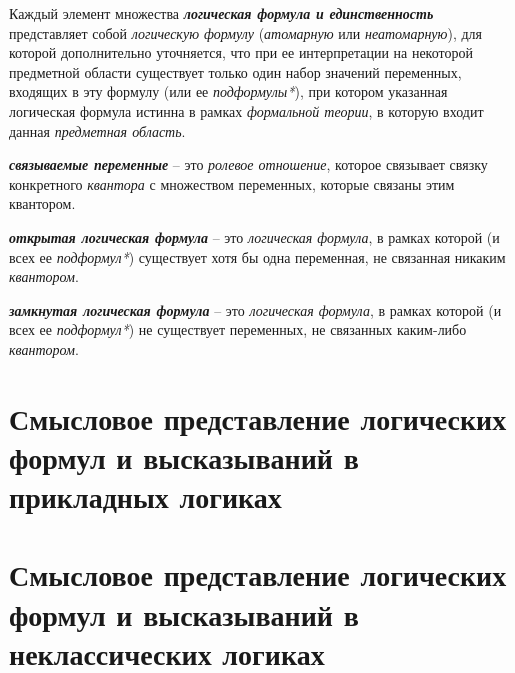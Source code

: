 Каждый элемент множества \textbf{\textit{логическая формула и единственность}} представляет собой \textit{логическую формулу} (\textit{атомарную} или \textit{неатомарную}), для которой дополнительно уточняется, что при ее интерпретации на некоторой предметной области существует только один набор значений переменных, входящих в эту формулу (или ее \textit{подформулы*}), при котором указанная логическая формула истинна в рамках \textit{формальной теории}, в которую входит данная \textit{предметная область}.



\textbf{\textit{связываемые переменные\scnrolesign}} -- это \textit{ролевое отношение}, которое связывает связку конкретного \textit{квантора} с множеством переменных, которые связаны этим квантором.

\textbf{\textit{открытая логическая формула}} -- это \textit{логическая формула}, в рамках которой (и всех ее \textit{подформул*}) существует хотя бы одна переменная, не связанная никаким \textit{квантором}.

\textbf{\textit{замкнутая логическая формула}} -- это \textit{логическая формула}, в рамках которой (и всех ее \textit{подформул*}) не существует переменных, не связанных каким-либо \textit{квантором}.


\section{Смысловое представление логических формул и высказываний  в прикладных логиках}

\section{Смысловое представление логических формул и высказываний в неклассических логиках}

%